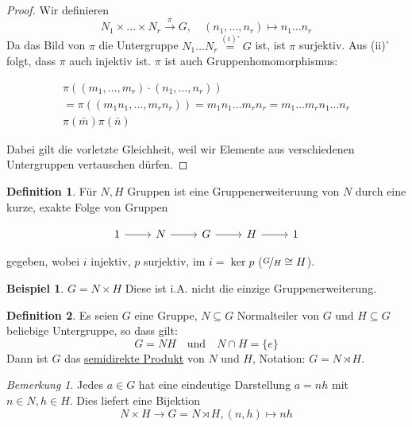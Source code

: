 \documentclass[12pt]{scrartcl}%
\theoremstyle{definition}
\newtheorem*{defn}{Definition}
\newtheorem{ex}{Beispiel}
\theoremstyle{remark}
\newtheorem*{nb}{Bemerkung}
\begin{document}
\begin{proof}
    Wir definieren $$N_1\times\dots\times N_r \overset{\pi}{\longrightarrow} G,\quad (n_1,\dots,n_r)\mapsto n_1\dots n_r$$ Da das Bild von $\pi$ die Untergruppe $N_1\dots N_r \overset{(i)'}{=} G$ ist, ist $\pi$ surjektiv. Aus (ii)' folgt, dass $\pi$ auch injektiv ist. $\pi$ ist auch Gruppenhomomorphismus: 
    
    \begin{align*}
        \pi((m_1,\dots,m_r)\cdot (n_1,\dots,n_r)) \\
        =\pi((m_1n_1,\dots,m_rn_r))=m_1n_1\dots m_rn_r=m_1\dots m_rn_1\dots n_r \\
        \pi(\bar m)\pi(\bar n)
    \end{align*}
    
    Dabei gilt die vorletzte Gleichheit, weil wir Elemente aus verschiedenen Untergruppen vertauschen dürfen.
\end{proof}

\begin{defn}
    Für $N,H$ Gruppen ist eine Gruppenerweiteruung von $N$ durch eine kurze, exakte Folge von Gruppen
    
    \[ \begin{tikzcd}
        1 \arrow[r] & N \arrow[r] & G \arrow[r] & H \arrow[r] & 1
    \end{tikzcd} \]
    
    gegeben, wobei $i$ injektiv, $p$ surjektiv, $\text{im } i = \ker p$ ($\nicefrac{G}{H} \cong H$).

\end{defn}

\begin{ex}
    $G=N\times H$ Diese ist i.A. nicht die einzige Gruppenerweiterung.
\end{ex}

\begin{defn}
    Es seien $G$ eine Gruppe, $N\subseteq G$ Normalteiler von $G$ und $H\subseteq G$ beliebige Untergruppe, so dass gilt: $$G=NH \quad \text{und} \quad N\cap H = \{e\}$$ Dann ist $G$ das \underline{semidirekte Produkt} von $N$ und $H$, Notation: $G=N\rtimes H$.
\end{defn}

\begin{nb}
    Jedes $a\in G$ hat eine eindeutige Darstellung $a=nh$ mit $n\in N, h\in H$. Dies liefert eine Bijektion $$N\times H \to G=N\rtimes H, (n,h)\mapsto nh$$
\end{nb}
\end{document}
